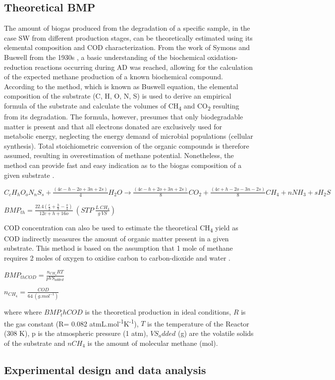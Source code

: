 \subsection{Theoretical BMP}
The amount of biogas produced from the degradation of a specific sample, in the case SW from different production stages, can be theoretically estimated using its elemental composition and COD characterization. From the work of Symons and Buswell from the 1930s \cite{Symons_1933}, a basic understanding of the biochemical oxidation-reduction reactions occurring during AD was reached, allowing for the calculation of the expected methane production of a known biochemical compound. According to the method, which is known as Buswell equation, the elemental composition of the substrate (C, H, O, N, S) is used to derive an empirical formula of the substrate and calculate the volumes of CH\textsubscript{4} and CO\textsubscript{2} resulting from its degradation. The formula, however, presumes that only biodegradable matter is present and that all electrons donated are exclusively used for metabolic energy, neglecting the energy demand of microbial populations (cellular synthesis)\cite{Labatut_2011,Lesteur_2010}. Total stoichiometric conversion of the organic compounds is therefore assumed, resulting in overestimation of methane potential. Nonetheless, the method can provide fast and easy indication as to the biogas composition of a given substrate \cite{Ware_2016}.

\(C_cH_hO_oN_nS_s+\frac{(4c-h-2o+3n+2s)}{4}H_2O→\frac{(4c-h+2o+3n+2s)}{8}CO_2+\frac{(4c+h-2o-3n-2s)}{8}CH_4+nNH_3+sH_2S\)

\(BMP_{th}=\frac{22.4\left(\frac{c}{2}+\frac{h}{8}-\frac{o}{4}\right)}{12c+h+16o}\ \left(STP\ \frac{L\ CH_4}{g\ VS}\right)\)

COD concentration can also be used to estimate the theoretical CH\textsubscript{4} yield as COD indirectly measures the amount of organic matter present in a given substrate. This method is based on the assumption that 1 mole of methane requires 2 moles of oxygen to oxidise carbon to carbon-dioxide and water \cite{Jingura_2017,Nielfa_2015}. 

\(BMP_{thCOD}=\frac{n_{CH_4}RT}{pVS_{added}}\)

\(n_{CH_4}=\frac{COD}{64\ \left(g.mol^{-1}\right)}\)

where where $BMP_thCOD$ is the theoretical production in ideal conditions, $R$ is the gas constant (R= 0.082 atmL.mol\textsuperscript{-1}K\textsuperscript{-1}), $T$ is the temperature of the Reactor (308 K), p is the atmospheric pressure (1 atm), $VS_added$ (g) are the volatile solids of the substrate and $nCH_4$ is the amount of molecular methane (mol).

\subsection{Experimental design and data analysis}


